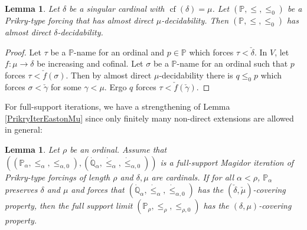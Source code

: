 \documentclass[a4paper]{amsart}
\theoremstyle{definition}
\theoremstyle{remark}
\theoremstyle{plain}
\newtheorem{mylem}[mydef]{Lemma}
\numberwithin{mydef}{section}
\DeclareMathOperator{\cf}{cf}
\newcommand{\dP}{\mathbb{P}}
\newcommand{\dQ}{\mathbb{Q}}
\begin{document}
	\begin{mylem}\label{SingAlmostDec}
		Let $\delta$ be a singular cardinal with $\cf(\delta)=\mu$. Let $(\dP,\leq,\leq_0)$ be a Prikry-type forcing that has almost direct $\mu$-decidability. Then $(\dP,\leq,\leq_0)$ has almost direct $\delta$-decidability.
	\end{mylem}
	
	\begin{proof}
		Let $\tau$ be a $\dP$-name for an ordinal and $p\in\dP$ which forces $\tau<\check{\delta}$. In $V$, let $f\colon\mu\to\delta$ be increasing and cofinal. Let $\sigma$ be a $\dP$-name for an ordinal such that $p$ forces $\tau<\check{f}(\sigma)$. Then by almost direct $\mu$-decidability there is $q\leq_0p$ which forces $\sigma<\check{\gamma}$ for some $\gamma<\mu$. Ergo $q$ forces $\tau<\check{f}(\check{\gamma})$.
	\end{proof}
	
	For full-support iterations, we have a strengthening of Lemma \ref{PrikryIterEastonMu} since only finitely many non-direct extensions are allowed in general:
	
	\begin{mylem}\label{DirectDecideCapture}
		Let $\rho$ be an ordinal. Assume that $((\dP_{\alpha},\leq_{\alpha},\leq_{\alpha,0}),(\dot{\dQ}_{\alpha},\dot{\leq}_{\alpha},\dot{\leq}_{\alpha,0}))$ is a full-support Magidor iteration of Prikry-type forcings of length $\rho$ and $\delta,\mu$ are cardinals. If for all $\alpha<\rho$, $\dP_{\alpha}$ preserves $\delta$ and $\mu$ and forces that $(\dot{\dQ}_{\alpha},\dot{\leq}_{\alpha},\dot{\leq}_{\alpha,0})$ has the $(\check{\delta},\check{\mu})$-covering property, then the full support limit $(\dP_{\rho},\leq_{\rho},\leq_{\rho,0})$ has the $(\delta,\mu)$-covering property.
	\end{mylem}
	
\end{document}
